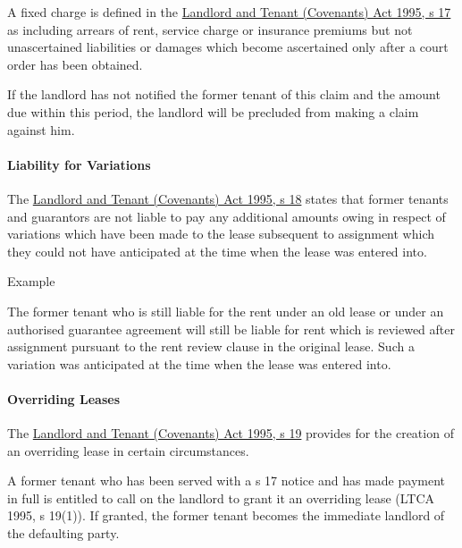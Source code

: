 \documentclass[
]{article}
\newenvironment{env-8fa37bb4-768d-4893-9e93-b3dc64db7fb6}
{
    \savenotes\tcolorbox[blanker,breakable,left=5pt,borderline west={2pt}{-4pt}{purple}]
}
{
    \endtcolorbox\spewnotes
}
\begin{document}
A fixed charge is defined in the
\href{https://www.legislation.gov.uk/ukpga/1995/30/section/17}{Landlord
and Tenant (Covenants) Act 1995, s 17} as including arrears of rent,
service charge or insurance premiums but not unascertained liabilities
or damages which become ascertained only after a court order has been
obtained.

If the landlord has not notified the former tenant of this claim and the
amount due within this period, the landlord will be precluded from
making a claim against him.

\hypertarget{liability-for-variations}{%
\paragraph{Liability for Variations}\label{liability-for-variations}}

The
\href{https://www.legislation.gov.uk/ukpga/1995/30/section/18}{Landlord
and Tenant (Covenants) Act 1995, s 18} states that former tenants and
guarantors are not liable to pay any additional amounts owing in respect
of variations which have been made to the lease subsequent to assignment
which they could not have anticipated at the time when the lease was
entered into.

\begin{env-8fa37bb4-768d-4893-9e93-b3dc64db7fb6}

Example

The former tenant who is still liable for the rent under an old lease or
under an authorised guarantee agreement will still be liable for rent
which is reviewed after assignment pursuant to the rent review clause in
the original lease. Such a variation was anticipated at the time when
the lease was entered into.

\end{env-8fa37bb4-768d-4893-9e93-b3dc64db7fb6}

\hypertarget{overriding-leases}{%
\paragraph{Overriding Leases}\label{overriding-leases}}

The
\href{https://www.legislation.gov.uk/ukpga/1995/30/section/19}{Landlord
and Tenant (Covenants) Act 1995, s 19} provides for the creation of an
overriding lease in certain circumstances.

A former tenant who has been served with a s 17 notice and has made
payment in full is entitled to call on the landlord to grant it an
overriding lease (LTCA 1995, s 19(1)). If granted, the former tenant
becomes the immediate landlord of the defaulting party.
\end{document}
